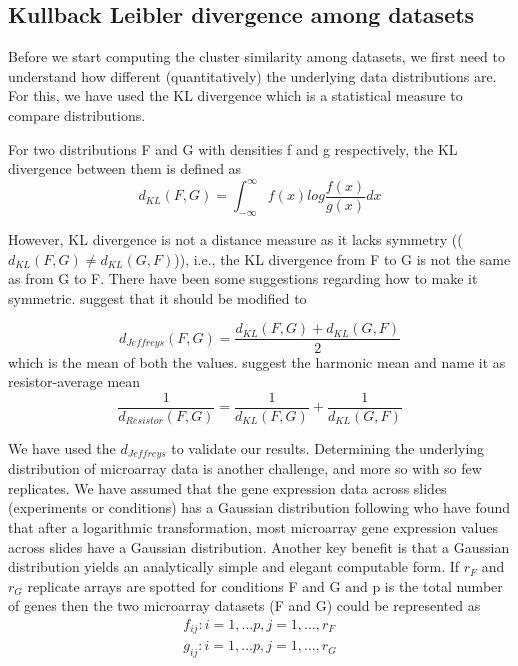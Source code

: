 \subsection{Kullback Leibler divergence among datasets}\label{kl-divergence}
Before we start computing the cluster similarity among datasets, we first need to understand how different (quantitatively) the underlying data distributions are. For this, we have used the \ac{KL} divergence which is a statistical measure to compare distributions. 

For two distributions F and G with densities f and g respectively, the \ac{KL} divergence between them is defined as 
\begin{equation}
d_{KL}(F,G) = \int_{-\infty}^{\infty}f(x)log\frac{f(x)}{g(x)}dx
\end{equation}

However, \ac{KL} divergence is not a distance measure as it lacks symmetry (($d_{KL}(F,G)\neq d_{KL}(G,F)$)), i.e., the \ac{KL} divergence from F to G is not the same as from G to F. There have been some suggestions regarding how to make it symmetric. \citet{Jeffreys46} suggest that it should be modified to 

\begin{equation}
d_{Jeffreys}(F,G) = \frac{d_{KL}(F,G) + d_{KL}(G,F)}{2} \label{KL-Jeffreys}
\end{equation}
which is the mean of both the values. \citet{Johnson01symmetrizing} suggest the harmonic mean and name it as resistor-average mean
\begin{equation}
\frac{1}{d_{Resistor}(F,G)} = \frac{1}{d_{KL}(F,G)} + \frac{1}{d_{KL}(G,F)} 
\end{equation}

We have used the $d_{Jeffreys}$ to validate our results. Determining the underlying distribution of microarray data is another challenge, and more so with so few replicates. We have assumed that the gene expression data across slides (experiments or conditions) has a Gaussian distribution following \citet{ernstwit2004statis_microarrays} who have found that after a logarithmic transformation, most microarray gene expression values across slides have a Gaussian distribution. Another key benefit is that a Gaussian distribution yields an analytically simple and elegant computable form. If $r_{F}$ and $r_{G}$ replicate arrays are spotted for conditions F and G and p is the total number of genes then the two microarray datasets (F and G) could be represented as
\begin{eqnarray*}
f_{ij}: i = 1,\dots p, j = 1,\dots ,r_{F} \\
g_{ij}: i = 1,\dots p, j = 1,\dots ,r_{G}
\end{eqnarray*} 

